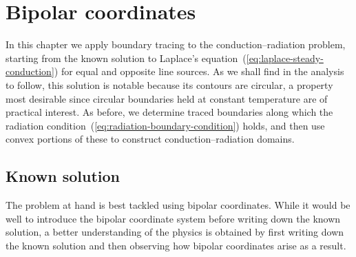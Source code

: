 \chapter{Bipolar coordinates}
\label{ch:bipolar}

In this chapter
we apply boundary tracing to the conduction--radiation problem,
starting from the known solution
to Laplace's equation~(\ref{eq:laplace-steady-conduction})
for equal and opposite line sources.
As we shall find in the analysis to follow,
this solution is notable because its contours are circular,
a property most desirable
since circular boundaries held at constant temperature
are of practical interest.
As before,
we determine traced boundaries along which
the radiation condition~(\ref{eq:radiation-boundary-condition}) holds,
and then use convex portions of these
to construct conduction--radiation domains.

\section{Known solution}
\label{sec:bipolar.known}

The problem at hand is best tackled using bipolar coordinates.
While it would be well to introduce the bipolar coordinate system
before writing down the known solution,
a better understanding of the physics is obtained
by first writing down the known solution
and then observing how bipolar coordinates arise as a result.

